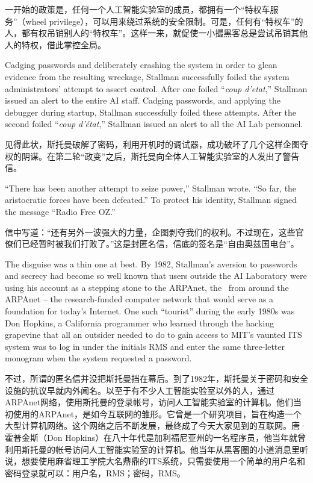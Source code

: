\ifdefined\chs
一开始的政策是，任何一个人工智能实验室的成员，都拥有一个``特权车服务''（wheel privilege），可以用来绕过系统的安全限制。可是，任何有``特权车''的人，都有权吊销别人的``特权车''。这样一来，就促使一小撮黑客总是尝试吊销其他人的特权，借此掌控全局。
\fi
\fi

\ifdefined\eng
\ifdefined\vone
Cadging passwords and deliberately crashing the system in order to glean evidence from the resulting wreckage, Stallman successfully foiled the system administrators' attempt to assert control. After one foiled ``\textit{coup d'etat},'' Stallman issued an alert to the entire AI staff.
\fi
\ifdefined\vtwo
Cadging passwords, and applying the debugger during startup, Stallman successfully foiled these attempts. After the second foiled ``\textit{coup d'état},'' Stallman issued an alert to all the AI Lab personnel.
\fi
\fi

\ifdefined\chs
见得此状，斯托曼破解了密码，利用开机时的调试器，成功破坏了几个这样企图夺权的阴谋。在第二轮``政变''之后，斯托曼向全体人工智能实验室的人发出了警告信。
\fi

\ifdefined\eng
``There has been another attempt to seize power,'' Stallman wrote. ``So far, the aristocratic forces have been defeated.'' To protect his identity, Stallman signed the message ``Radio Free OZ.''
\fi

\ifdefined\chs
信中写道：``还有另外一波强大的力量，企图剥夺我们的权利。不过现在，这些官僚们已经暂时被我们打败了。''这是封匿名信，信底的签名是``自由奥兹国电台''。
\fi

\ifdefined\eng
The disguise was a thin one at best. By 1982, Stallman's aversion to passwords and secrecy had become so well known that users outside the AI Laboratory were using his account \ifdefined\vone as a stepping stone to the ARPAnet, the \fi\ifdefined\vtwo\ from around the ARPAnet -- the \fi research-funded computer network that would serve as a foundation for today's Internet. One such ``tourist'' during the early 1980s was Don Hopkins, a California programmer who learned through the hacking grapevine that all an outsider needed to do to gain access to MIT's vaunted ITS system was to log in under the initials RMS and enter the same three-letter monogram when the system requested a password.
\fi

\ifdefined\chs
不过，所谓的匿名信并没把斯托曼挡在幕后。到了1982年，斯托曼关于密码和安全设施的抗议早就内外闻名。以至于有不少人工智能实验室以外的人，通过ARPAnet网络，使用斯托曼的登录帐号，访问人工智能实验室的计算机。他们当初使用的ARPAnet，是如今互联网的雏形。它曾是一个研究项目，旨在构造一个大型计算机网络。这个网络之后不断发展，最终成了今天大家见到的互联网。唐·霍普金斯（Don Hopkins）在八十年代是加利福尼亚州的一名程序员，他当年就曾利用斯托曼的帐号访问人工智能实验室的计算机。他当年从黑客圈的小道消息里听说，想要使用麻省理工学院大名鼎鼎的ITS系统，只需要使用一个简单的用户名和密码登录就可以：用户名，RMS；密码，RMS。
\fi

